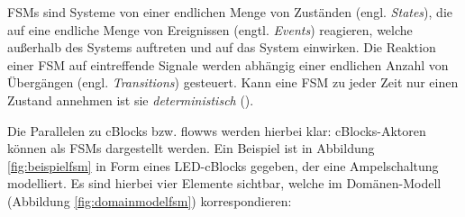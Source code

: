 \acp{FSM} sind Systeme von einer endlichen Menge von Zuständen (engl. \textit{States}), die auf eine endliche Menge von Ereignissen (engtl. \textit{Events}) reagieren, welche außerhalb des Systems auftreten und auf das System einwirken. Die Reaktion einer \ac{FSM} auf eintreffende Signale werden abhängig einer endlichen Anzahl von Übergängen (engl. \textit{Transitions}) gesteuert. Kann eine \ac{FSM} zu jeder Zeit nur einen Zustand annehmen ist sie \textit{deterministisch} (\cite{hopcroft2013introduction}). 

Die Parallelen zu cBlocks bzw. flowws werden hierbei klar: cBlocks-Aktoren können als \acp{FSM} dargestellt werden. Ein Beispiel ist in Abbildung \ref{fig:beispielfsm} in Form eines LED-cBlocks gegeben, der eine Ampelschaltung modelliert. Es sind hierbei vier Elemente sichtbar, welche im Domänen-Modell (Abbildung \ref{fig:domainmodelfsm}) korrespondieren:
